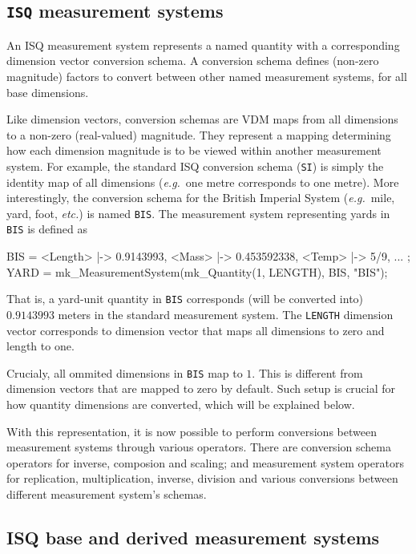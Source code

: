 \documentclass[runningheads,a4paper]{llncs}
\begin{document}
\subsection*{\texttt{ISQ} measurement systems}

An ISQ measurement system represents a named quantity with a corresponding dimension vector conversion schema. A conversion schema defines (non-zero magnitude) factors to convert between other named measurement systems, for all base dimensions. 

Like dimension vectors, conversion schemas are VDM maps from all dimensions to a non-zero (real-valued) magnitude.    
They represent a mapping determining how each dimension magnitude is to be viewed within another measurement system. For example, the standard ISQ conversion schema (\texttt{SI}) is simply the identity map of all dimensions (\textit{e.g.}~one metre corresponds to one metre). More interestingly, the conversion schema for the British Imperial System (\textit{e.g.}~mile, yard, foot, \textit{etc.}) is named \texttt{BIS}. The measurement system representing yards in \texttt{BIS} is defined as     
%
\begin{vdmsl}[frame=none,basicstyle=\ttfamily\scriptsize]
  BIS  = { <Length> |-> 0.9143993, <Mass> |-> 0.453592338, <Temp> |-> 5/9, ... };
  YARD = mk_MeasurementSystem(mk_Quantity(1, LENGTH), BIS, "BIS");
\end{vdmsl}          
%
\noindent That is, a yard-unit quantity in \texttt{BIS} corresponds (will be converted into) \(0.9143993\) meters in the standard measurement system. The \texttt{LENGTH} dimension vector corresponds to dimension vector that maps all dimensions to zero and length to one.    

Crucialy, all ommited dimensions in \texttt{BIS} map to \(1\). This is different from dimension vectors that are mapped to zero by default. Such setup is crucial for how quantity dimensions are converted, which will be explained below.

With this representation, it is now possible to perform conversions between measurement systems through various operators. There are conversion schema operators for inverse, composion and scaling; and measurement system operators for replication, multiplication, inverse, division and various conversions between different measurement system's schemas. 

\subsection*{ISQ base and derived measurement systems}
\end{document}
